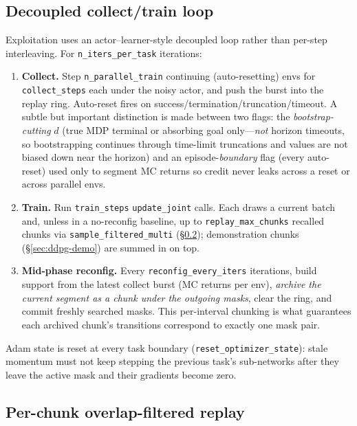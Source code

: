 \documentclass[11pt]{article}
\newcommand{\code}[1]{\texttt{\small #1}}
\begin{document}
\subsection{Decoupled collect/train loop}
\label{sec:ddpg-loop}

Exploitation uses an actor--learner-style decoupled loop rather than per-step
interleaving. For \code{n\_iters\_per\_task} iterations:
\begin{enumerate}[leftmargin=2em,itemsep=1pt]
  \item \textbf{Collect.} Step \code{n\_parallel\_train} continuing
  (auto-resetting) envs for \code{collect\_steps} each under the noisy actor, and
  push the burst into the replay ring. Auto-reset fires on
  success/termination/truncation/timeout. A subtle but important distinction is
  made between two flags: the \emph{bootstrap-cutting} $d$ (true MDP terminal or
  absorbing goal only---\emph{not} horizon timeouts, so bootstrapping continues
  through time-limit truncations and values are not biased down near the horizon)
  and an episode-\emph{boundary} flag (every auto-reset) used only to segment MC
  returns so credit never leaks across a reset or across parallel envs.
  \item \textbf{Train.} Run \code{train\_steps} \code{update\_joint} calls. Each
  draws a current batch and, unless in a no-reconfig baseline, up to
  \code{replay\_max\_chunks} recalled chunks via \code{sample\_filtered\_multi}
  (\S\ref{sec:ddpg-replay}); demonstration chunks (\S\ref{sec:ddpg-demo}) are
  summed in on top.
  \item \textbf{Mid-phase reconfig.} Every \code{reconfig\_every\_iters}
  iterations, build support from the latest collect burst (MC returns per env),
  \emph{archive the current segment as a chunk under the outgoing masks}, clear
  the ring, and commit freshly searched masks. This per-interval chunking is what
  guarantees each archived chunk's transitions correspond to exactly one mask
  pair.
\end{enumerate}
Adam state is reset at every task boundary (\code{reset\_optimizer\_state}): stale
momentum must not keep stepping the previous task's sub-networks after they leave
the active mask and their gradients become zero.

\subsection{Per-chunk overlap-filtered replay}
\label{sec:ddpg-replay}
\end{document}
